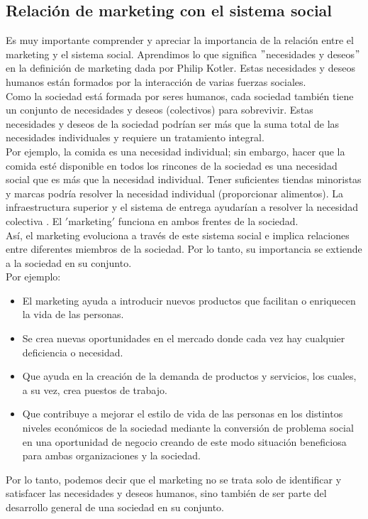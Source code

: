 \documentclass[10pt]{book}
\begin{document}
\subsection{Relación de marketing con el sistema social}
Es muy importante comprender y apreciar la importancia de la relación entre el marketing y el sistema social. Aprendimos lo que significa $"$necesidades y deseos$"$ en la definición de marketing dada por Philip Kotler. Estas necesidades y deseos humanos están formados por la interacción de varias fuerzas sociales.  \\
Como la sociedad está formada por seres humanos, cada sociedad también tiene un conjunto de necesidades y deseos (colectivos) para sobrevivir. Estas necesidades y deseos de la sociedad podrían ser más que la suma total de las necesidades individuales y requiere un tratamiento integral.  \\
Por ejemplo, la comida es una necesidad individual; sin embargo, hacer que la comida esté disponible en todos los rincones de la sociedad es una necesidad social que es más que la necesidad individual. Tener suficientes tiendas minoristas y marcas podría resolver la necesidad individual (proporcionar alimentos). La infraestructura superior y el sistema de entrega ayudarían a resolver la necesidad colectiva . El $'$marketing$'$ funciona en ambos frentes de la sociedad.\\
Así, el marketing evoluciona a través de este sistema social e implica relaciones entre diferentes miembros de la sociedad. Por lo tanto, su importancia se extiende a la sociedad en su conjunto.\\
Por ejemplo:
\begin{itemize}
\item El marketing ayuda a introducir nuevos productos que facilitan o enriquecen la vida de las personas.
\item Se crea nuevas oportunidades en el mercado donde cada vez hay cualquier deficiencia o necesidad.
\item Que ayuda en la creación de la demanda de productos y servicios, los cuales, a su vez, crea puestos de trabajo.
\item Que contribuye a mejorar el estilo de vida de las personas en los distintos niveles económicos de la sociedad mediante la conversión de problema social en una oportunidad de negocio creando de este modo situación beneficiosa para ambas organizaciones y la sociedad.
\end{itemize}
Por lo tanto, podemos decir que el marketing no se trata solo de identificar y satisfacer las necesidades y deseos humanos, sino también de ser parte del desarrollo general de una sociedad en su conjunto.
\end{document}
